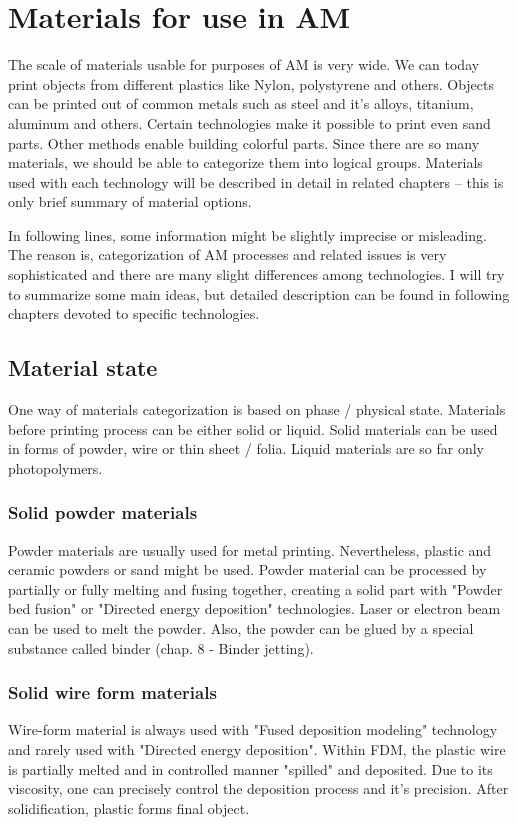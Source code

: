 \documentclass[a4paper, twoside, 11pt]{report}
\begin{document}
\chapter{Materials for use in AM}
The scale of materials usable for purposes of AM is very wide. We can today print objects from different plastics like Nylon, polystyrene and others. Objects can be printed out of common metals such as steel and it's alloys, titanium, aluminum and others. Certain technologies make it possible to print even sand parts. Other methods enable building colorful parts. Since there are so many materials, we should be able to categorize them into logical groups. Materials used with each technology will be described in detail in related chapters – this is only brief summary of material options.

	In following lines, some information might be slightly imprecise or misleading. The reason is, categorization of AM processes and related issues is very sophisticated and there are many slight differences among technologies. I will try to summarize some main ideas, but detailed description can be found in following chapters devoted to specific technologies.\\

\section{Material state}
One way of materials categorization is based on phase / physical state. Materials before printing process can be either solid or liquid. Solid materials can be used in forms of powder, wire or thin sheet / folia. Liquid materials are so far only photopolymers.
\subsection{Solid powder materials}
Powder materials are usually used for metal printing. Nevertheless, plastic and ceramic powders or sand might be used. Powder material can be processed by partially or fully melting and fusing together, creating a solid part with "Powder bed fusion" or "Directed energy deposition" technologies. Laser or electron beam can be used to melt the powder. Also, the powder can be glued by a special substance called binder (chap. 8 - Binder jetting). 
\subsection{Solid wire form materials}
Wire-form material is always used with "Fused deposition modeling" technology and rarely used with "Directed energy deposition". Within FDM, the plastic wire is partially melted and in controlled manner "spilled" and deposited. Due to its viscosity, one can precisely control the deposition process and it's precision. After solidification, plastic forms final object.
\end{document}

